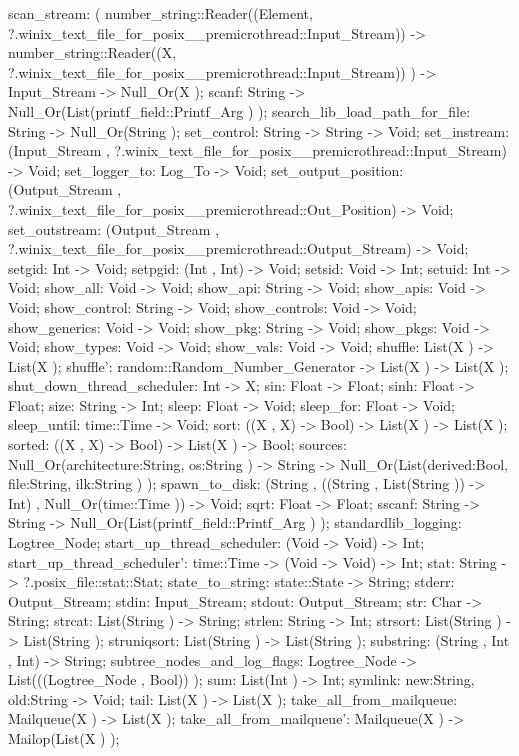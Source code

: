 scan_stream:
        (
        number_string::Reader((Element, ?.winix_text_file_for_posix__premicrothread::Input_Stream))
        ->
        number_string::Reader((X, ?.winix_text_file_for_posix__premicrothread::Input_Stream))
        )
    ->
    Input_Stream -> Null_Or(X );
scanf: String -> Null_Or(List(printf_field::Printf_Arg ) );
search_lib_load_path_for_file: String -> Null_Or(String );
set_control: String -> String -> Void;
set_instream: (Input_Stream , ?.winix_text_file_for_posix__premicrothread::Input_Stream) -> Void;
set_logger_to: Log_To -> Void;
set_output_position:
(Output_Stream , ?.winix_text_file_for_posix__premicrothread::Out_Position) -> Void;
set_outstream: (Output_Stream , ?.winix_text_file_for_posix__premicrothread::Output_Stream) -> Void;
setgid: Int -> Void;
setpgid: (Int , Int) -> Void;
setsid: Void -> Int;
setuid: Int -> Void;
show_all: Void -> Void;
show_api: String -> Void;
show_apis: Void -> Void;
show_control: String -> Void;
show_controls: Void -> Void;
show_generics: Void -> Void;
show_pkg: String -> Void;
show_pkgs: Void -> Void;
show_types: Void -> Void;
show_vals: Void -> Void;
shuffle: List(X ) -> List(X );
shuffle': random::Random_Number_Generator -> List(X ) -> List(X );
shut_down_thread_scheduler: Int -> X;
sin: Float -> Float;
sinh: Float -> Float;
size: String -> Int;
sleep: Float -> Void;
sleep_for: Float -> Void;
sleep_until: time::Time -> Void;
sort: ((X , X) -> Bool) -> List(X ) -> List(X );
sorted: ((X , X) -> Bool) -> List(X ) -> Bool;
sources:
    Null_Or({architecture:String, os:String} )
    ->
    String -> Null_Or(List({derived:Bool, file:String, ilk:String} ) );
spawn_to_disk: (String , ((String , List(String )) -> Int) , Null_Or(time::Time )) -> Void;
sqrt: Float -> Float;
sscanf: String -> String -> Null_Or(List(printf_field::Printf_Arg ) );
standardlib_logging: Logtree_Node;
start_up_thread_scheduler: (Void -> Void) -> Int;
start_up_thread_scheduler': time::Time -> (Void -> Void) -> Int;
stat: String -> ?.posix_file::stat::Stat;
state_to_string: state::State -> String;
stderr: Output_Stream;
stdin: Input_Stream;
stdout: Output_Stream;
str: Char -> String;
strcat: List(String ) -> String;
strlen: String -> Int;
strsort: List(String ) -> List(String );
struniqsort: List(String ) -> List(String );
substring: (String , Int , Int) -> String;
subtree_nodes_and_log_flags: Logtree_Node -> List(((Logtree_Node , Bool)) );
sum: List(Int ) -> Int;
symlink: {new:String, old:String} -> Void;
tail: List(X ) -> List(X );
take_all_from_mailqueue: Mailqueue(X ) -> List(X );
take_all_from_mailqueue': Mailqueue(X ) -> Mailop(List(X ) );
